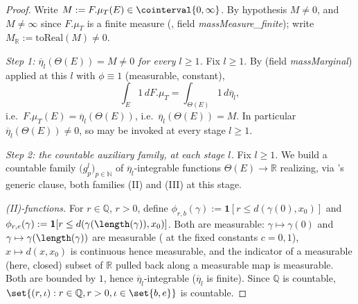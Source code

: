 \begin{proof}
  Write $M := F.\mu_T(E) \in \cointerval{0,\infty}$. By hypothesis $M \ne 0$, and $M \ne \infty$
  since $F.\mu_T$ is a finite measure (, field \emph{massMeasure\_finite}); write
  $M_{\mathbb R} := \mathrm{toReal}(M) \ne 0$.

  \emph{Step 1: $\overline\eta_l(\Theta(E)) = M \ne 0$ for every $l \ge 1$.} Fix $l \ge 1$. By
   (field \emph{massMarginal}) applied at this $l$ with $\phi \equiv 1$
  (measurable, constant),
  \[
    \int_E 1 \, dF.\mu_T = \int_{\Theta(E)} 1 \, d\overline\eta_l
    ,
  \]
  i.e.\ $F.\mu_T(E) = \overline\eta_l(\Theta(E))$, i.e.\ $\overline\eta_l(\Theta(E)) = M$. In
  particular $\overline\eta_l(\Theta(E)) \ne 0$, so  may be invoked at every
  stage $l \ge 1$.

  \emph{Step 2: the countable auxiliary family, at each stage $l$.} Fix $l \ge 1$. We build a
  countable family $\bigl(g^l_p\bigr)_{p\in\mathbb{N}}$ of $\overline\eta_l$-integrable functions
  $\Theta(E) \to \mathbb{R}$ realizing, via 's generic clause, both families
  (II) and (III) at this stage.

  \emph{(II)-functions.} For $r \in \mathbb{Q}$, $r>0$, define
  $\phi_{r,b}(\gamma) := \mathbf{1}[r\le d(\gamma(0),x_0)]$ and
  $\phi_{r,e}(\gamma) := \mathbf{1}[r\le d(\gamma(\length(\gamma)),x_0)]$. Both are measurable:
  $\gamma \mapsto \gamma(0)$ and $\gamma\mapsto\gamma(\length(\gamma))$ are measurable
  ( at the fixed constants $c=0,1$), $x\mapsto d(x,x_0)$ is
  continuous hence measurable, and the indicator of a measurable (here, closed) subset of
  $\mathbb R$ pulled back along a measurable map is measurable. Both are bounded by $1$, hence
  $\overline\eta_l$-integrable ($\overline\eta_l$ is finite). Since $\mathbb{Q}$ is countable,
  $\set{(r,\iota) : r\in\mathbb{Q}, r>0, \iota\in\set{b,e}}$ is countable.


\end{proof}
